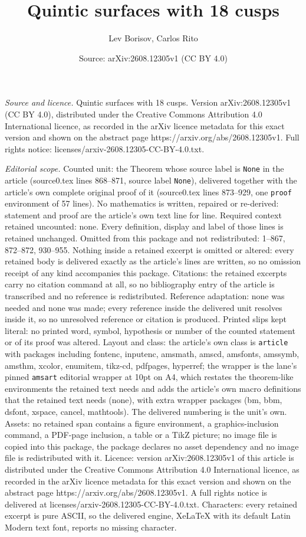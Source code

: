 \documentclass[10pt,a4paper]{amsart}
\title[Quintic surfaces with 18 cusps]{Quintic surfaces with 18 cusps}
\author{Lev Borisov, Carlos Rito}
\date{Source: arXiv:2608.12305v1 (CC BY 4.0)}
\begin{document}
\maketitle

\noindent\emph{Source and licence.} Quintic surfaces with 18 cusps. Version arXiv:2608.12305v1 (CC BY 4.0), distributed under the Creative Commons Attribution 4.0 International licence, as recorded in the arXiv licence metadata for this exact version and shown on the abstract page https://arxiv.org/abs/2608.12305v1. Full rights notice: licenses/arxiv-2608.12305-CC-BY-4.0.txt.\par\smallskip

\noindent\textit{Editorial scope.} Counted unit: the Theorem whose source label is \texttt{None} in the article (source0.tex lines 868--871, source label \texttt{None}), delivered together with the article's own complete original proof of it (source0.tex lines 873--929, one \texttt{proof} environment of 57 lines). No mathematics is written, repaired or re-derived: statement and proof are the article's own text line for line. Required context retained uncounted: none. Every definition, display and label of those lines is retained unchanged. Omitted from this package and not redistributed: 1--867, 872--872, 930--955. Nothing inside a retained excerpt is omitted or altered: every retained body is delivered exactly as the article's lines are written, so no omission receipt of any kind accompanies this package. Citations: the retained excerpts carry no citation command at all, so no bibliography entry of the article is transcribed and no reference is redistributed. Reference adaptation: none was needed and none was made; every reference inside the delivered unit resolves inside it, so no unresolved reference or citation is produced. Printed slips kept literal: no printed word, symbol, hypothesis or number of the counted statement or of its proof was altered. Layout and class: the article's own class is \texttt{article} with packages including fontenc, inputenc, amsmath, amscd, amsfonts, amssymb, amsthm, xcolor, enumitem, tikz-cd, pdfpages, hyperref; the wrapper is the lane's pinned \texttt{amsart} editorial wrapper at 10pt on A4, which restates the theorem-like environments the retained text needs and adds the article's own macro definitions that the retained text needs (none), with extra wrapper packages (bm, bbm, dsfont, xspace, cancel, mathtools). The delivered numbering is the unit's own. Assets: no retained span contains a figure environment, a graphics-inclusion command, a PDF-page inclusion, a table or a TikZ picture; no image file is copied into this package, the package declares no asset dependency and no image file is redistributed with it. Licence: version arXiv:2608.12305v1 of this article is distributed under the Creative Commons Attribution 4.0 International licence, as recorded in the arXiv licence metadata for this exact version and shown on the abstract page https://arxiv.org/abs/2608.12305v1. A full rights notice is delivered at licenses/arxiv-2608.12305-CC-BY-4.0.txt. Characters: every retained excerpt is pure ASCII, so the delivered engine, XeLaTeX with its default Latin Modern text font, reports no missing character.
\end{document}
